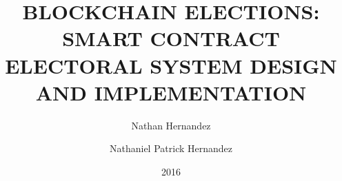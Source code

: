 \documentclass[natbib=false,MS]{./class/asu-nateph}
\author{Nathan Hernandez}
\title{BLOCKCHAIN ELECTIONS: SMART CONTRACT ELECTORAL SYSTEM DESIGN AND IMPLEMENTATION}
\date{2016} %
\author{Nathaniel Patrick Hernandez}
\begin{document}

\VerbatimFootnotes{} %

\begin{preliminary}
    \maketitle

  \makeapproval

  \makecopyright

  

  



\end{preliminary}
\end{document}
